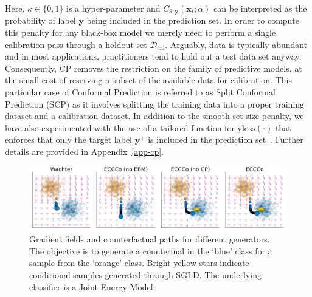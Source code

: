 \documentclass{article}
\begin{document}
Here, $\kappa \in \{0,1\}$ is a hyper-parameter and $C_{\theta,\mathbf{y}}(\mathbf{x}_i;\alpha)$ can be interpreted as the probability of label $\mathbf{y}$ being included in the prediction set. In order to compute this penalty for any black-box model we merely need to perform a single calibration pass through a holdout set $\mathcal{D}_{\text{cal}}$. Arguably, data is typically abundant and in most applications, practitioners tend to hold out a test data set anyway. Consequently, CP removes the restriction on the family of predictive models, at the small cost of reserving a subset of the available data for calibration. This particular case of Conformal Prediction is referred to as Split Conformal Prediction (SCP) as it involves splitting the training data into a proper training dataset and a calibration dataset. In addition to the smooth set size penalty, we have also experimented with the use of a tailored function for $\text{yloss}(\cdot)$ that enforces that only the target label $\mathbf{y}^+$ is included in the prediction set~\citep{stutz2022learning}. Further details are provided in Appendix~\ref{app-cp}.

\begin{figure}
  \centering
  \includegraphics[width=1.0\textwidth]{../artifacts/results/images/poc_gradient_fields.png}
  \caption{Gradient fields and counterfactual paths for different generators. The objective is to generate a counterfual in the `blue' class for a sample from the `orange' class. Bright yellow stars indicate conditional samples generated through SGLD. The underlying classifier is a Joint Energy Model.}\label{fig:poc}
\end{figure}

\renewcommand{\algorithmicrequire}{\textbf{Input:}}
\renewcommand{\algorithmicensure}{\textbf{Output:}}
\end{document}
